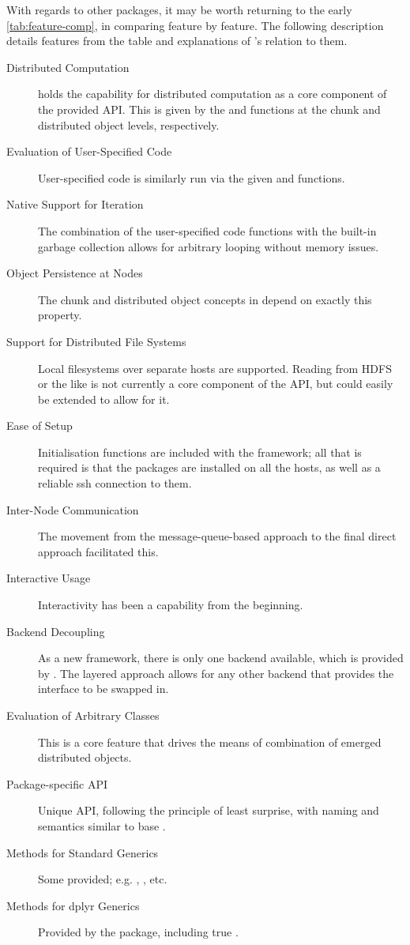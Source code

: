 With regards to other packages, it may be worth returning to the early \cref{tab:feature-comp}, in comparing feature by feature.
The following description details features from the table and explanations of \lsr{}'s relation to them.

\begin{description}
\item[Distributed Computation] \lsr{} holds the capability for distributed computation as a core component of the provided API. This is given by the  and  functions at the chunk and distributed object levels, respectively.
\item[Evaluation of User-Specified Code] User-specified code is similarly run via the given  and  functions.
\item[Native Support for Iteration] The combination of the user-specified code functions with the built-in garbage collection allows for arbitrary looping without memory issues.
\item[Object Persistence at Nodes] The chunk and distributed object concepts in \lsr{} depend on exactly this property.
\item[Support for Distributed File Systems] Local filesystems over separate hosts are supported. Reading from HDFS or the like is not currently a core component of the API, but could easily be extended to allow for it.
\item[Ease of Setup] Initialisation functions are included with the framework; all that is required is that the \lsr{} packages are installed on all the hosts, as well as a reliable ssh connection to them.
\item[Inter-Node Communication] The movement from the message-queue-based approach to the final direct approach facilitated this.
\item[Interactive Usage] Interactivity has been a capability from the beginning.
\item[Backend Decoupling] As a new framework, there is only one backend available, which is provided by \orcv{}. The layered approach allows for any other backend that provides the \orcv{} interface to be swapped in.
\item[Evaluation of Arbitrary Classes] This is a core feature that drives the means of combination of emerged distributed objects.
\item[Package-specific API] Unique API, following the principle of least surprise, with naming and semantics similar to base \R{}.
\item[Methods for Standard Generics] Some provided; e.g. , , etc.
\item[Methods for dplyr Generics] Provided by the \lso{} package, including true .
\end{description}

